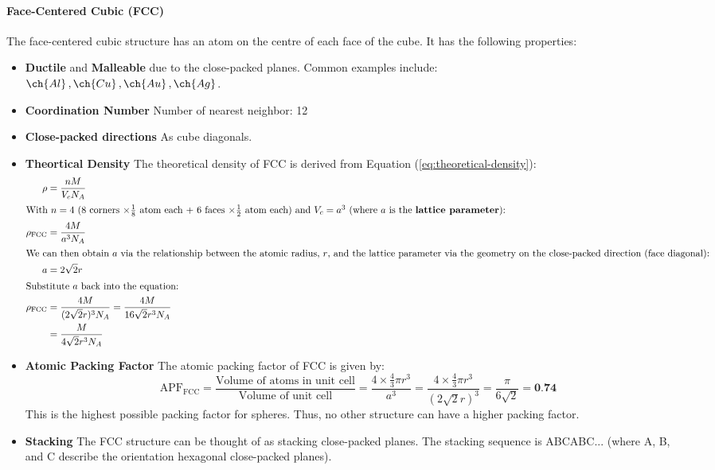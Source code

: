 \documentclass[11pt]{report}
\begin{document}
\paragraph{Face-Centered Cubic (FCC)} The face-centered cubic structure has an atom on the centre of each face of the cube. It has the following properties:
\begin{itemize}
    \item \textbf{Ductile} and \textbf{Malleable} due to the close-packed planes. Common examples include: \\ $\ch{Al}\, ,\ch{Cu}\, ,\ch{Au}\, ,\ch{Ag}$.
    \item \textbf{Coordination Number} Number of nearest neighbor: 12
    \item \textbf{Close-packed directions} As cube diagonals.
    \item \textbf{Theortical Density} The theoretical density of FCC is derived from Equation (\ref{eq:theoretical-density}):
    \begin{align}
        \rho &= \frac{nM}{V_c N_A} \nonumber \\
        \intertext{With $n = 4$ (8 corners $\times \frac{1}{8}$ atom each + 6 faces $\times \frac{1}{2}$ atom each) and $V_c = a^3$ (where $a$ is the \textbf{lattice parameter}):}
        \rho_\text{FCC} &= \frac{4M}{a^3 N_A} \nonumber \\
        \intertext{We can then obtain $a$ via the relationship between the atomic radius, $r$, and the lattice parameter via the geometry on the close-packed direction (face diagonal):}
        a &= 2\sqrt{2}r \nonumber \\
        \intertext{Substitute $a$ back into the equation:}
        \rho_\text{FCC} &= \frac{4M}{(2\sqrt{2}r)^3 N_A} = \frac{4M}{16\sqrt{2}r^3 N_A} \nonumber \\
        &= \frac{M}{4\sqrt{2}r^3 N_A} 
    \end{align}
    \item \textbf{Atomic Packing Factor} The atomic packing factor of FCC is given by:
    \begin{equation}
        \text{APF}_\text{FCC} = \frac{\text{Volume of atoms in unit cell}}{\text{Volume of unit cell} } = \frac{4 \times \frac{4}{3}\pi r^3}{a^3} = \frac{4 \times \frac{4}{3}\pi r^3}{(2\sqrt{2}r)^3} = \frac{\pi}{6\sqrt{2}} = \textbf{0.74}
    \end{equation}
    This is the highest possible packing factor for spheres. Thus, no other structure can have a higher packing factor.
    \item \textbf{Stacking} The FCC structure can be thought of as stacking close-packed planes. The stacking sequence is ABCABC... (where A, B, and C describe the orientation hexagonal close-packed planes).
\end{itemize}
\end{document}
